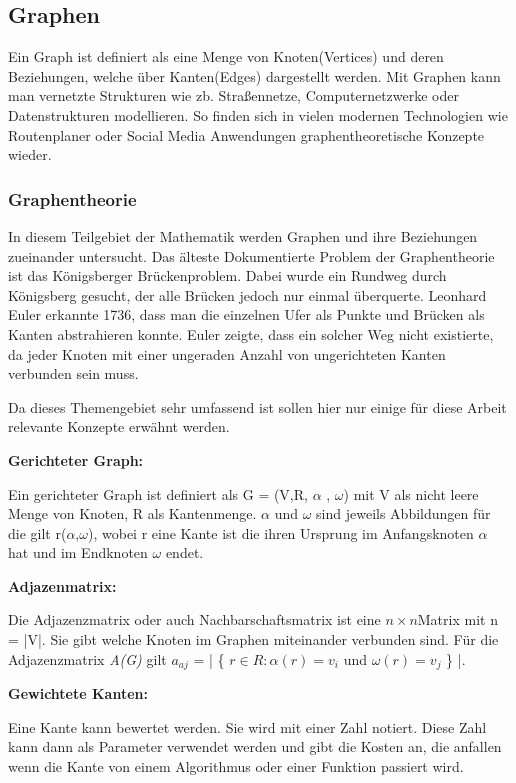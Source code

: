 
\subsection{Graphen}

Ein Graph ist definiert als eine Menge von Knoten(Vertices) und deren Beziehungen, welche über Kanten(Edges) dargestellt werden. Mit Graphen kann man vernetzte Strukturen wie zb. Straßennetze, Computernetzwerke oder Datenstrukturen modellieren. So finden sich in vielen modernen Technologien wie Routenplaner oder Social Media Anwendungen graphentheoretische Konzepte wieder.
	\subsubsection{Graphentheorie}
	In diesem Teilgebiet der Mathematik werden Graphen und ihre Beziehungen zueinander untersucht. Das älteste Dokumentierte Problem der Graphentheorie ist das Königsberger Brückenproblem. Dabei wurde ein Rundweg durch Königsberg gesucht, der alle Brücken jedoch nur einmal überquerte. Leonhard Euler erkannte 1736, dass man die einzelnen Ufer als Punkte und Brücken als Kanten abstrahieren konnte. Euler zeigte, dass ein solcher Weg nicht existierte, da jeder Knoten mit einer ungeraden Anzahl von ungerichteten Kanten verbunden sein muss.
	
	Da dieses Themengebiet sehr umfassend ist sollen hier nur einige für diese Arbeit relevante Konzepte erwähnt werden.
	
	\textbf{Gerichteter Graph: }
	
	Ein gerichteter Graph ist definiert als G = (V,R, $\alpha$ , $\omega$) mit V als nicht leere Menge von Knoten, R als Kantenmenge.  $\alpha$ und $\omega$ sind jeweils Abbildungen für die gilt r($\alpha$,$\omega$), wobei r eine Kante ist die ihren Ursprung im Anfangsknoten $\alpha$ hat und im Endknoten $\omega$ endet.
	
	\textbf{Adjazenmatrix:}
	
	Die Adjazenzmatrix oder auch Nachbarschaftsmatrix ist eine  $n\times n $Matrix mit n = |V|. Sie gibt welche Knoten im Graphen miteinander verbunden sind. Für die Adjazenzmatrix \textit{A(G)} gilt $a_{aj}$ = | \{ $r \in R: \alpha(r) = v_{i}$ und $\omega(r) = v_{j} $ \} |. 
	
	\textbf{Gewichtete Kanten:}
	
	Eine Kante kann bewertet werden. Sie wird mit einer Zahl notiert. Diese Zahl kann dann als Parameter verwendet werden und gibt die Kosten an, die anfallen wenn die Kante von einem Algorithmus oder einer Funktion passiert wird.
	
